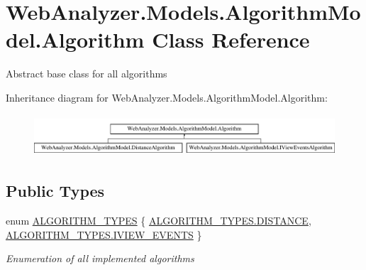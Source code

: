 \hypertarget{class_web_analyzer_1_1_models_1_1_algorithm_model_1_1_algorithm}{}\section{Web\+Analyzer.\+Models.\+Algorithm\+Model.\+Algorithm Class Reference}
\label{class_web_analyzer_1_1_models_1_1_algorithm_model_1_1_algorithm}


Abstract base class for all algorithms  


Inheritance diagram for Web\+Analyzer.\+Models.\+Algorithm\+Model.\+Algorithm\+:\begin{figure}[H]
\begin{center}
\leavevmode
\includegraphics[height=1.559888cm]{class_web_analyzer_1_1_models_1_1_algorithm_model_1_1_algorithm}
\end{center}
\end{figure}
\subsection*{Public Types}
\begin{DoxyCompactItemize}
\item 
enum \hyperlink{class_web_analyzer_1_1_models_1_1_algorithm_model_1_1_algorithm_a170e7786e033cbd0c09cabb30030794b}{A\+L\+G\+O\+R\+I\+T\+H\+M\+\_\+\+T\+Y\+P\+E\+S} \{ \hyperlink{class_web_analyzer_1_1_models_1_1_algorithm_model_1_1_algorithm_a170e7786e033cbd0c09cabb30030794bab06c2037eb7a58030a42212c8244d477}{A\+L\+G\+O\+R\+I\+T\+H\+M\+\_\+\+T\+Y\+P\+E\+S.\+D\+I\+S\+T\+A\+N\+C\+E}, 
\hyperlink{class_web_analyzer_1_1_models_1_1_algorithm_model_1_1_algorithm_a170e7786e033cbd0c09cabb30030794bac26c9f91b65d50d7c790272029d7dd49}{A\+L\+G\+O\+R\+I\+T\+H\+M\+\_\+\+T\+Y\+P\+E\+S.\+I\+V\+I\+E\+W\+\_\+\+E\+V\+E\+N\+T\+S}
 \}\begin{DoxyCompactList}\small\item\em Enumeration of all implemented algorithms \end{DoxyCompactList}
\end{DoxyCompactItemize}
